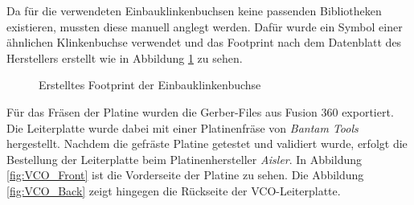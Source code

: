 Da für die verwendeten Einbauklinkenbuchsen keine passenden Bibliotheken existieren, mussten diese manuell anglegt werden.
Dafür wurde ein Symbol einer ähnlichen Klinkenbuchse verwendet und das Footprint nach dem Datenblatt des Herstellers erstellt wie in Abbildung \ref{fig:Klinkenbuchse Footprint} zu sehen.

\begin{figure}[h]
	\centering
	\setlength{\fboxsep}{1pt} %
	\setlength{\fboxrule}{1pt} %
	\caption{Erstelltes Footprint der Einbauklinkenbuchse}
	\label{fig:Klinkenbuchse Footprint}
\end{figure}


Für das Fräsen der Platine wurden die Gerber-Files aus Fusion 360 exportiert.
Die Leiterplatte wurde dabei mit einer Platinenfräse von \textit{Bantam Tools} hergestellt.
Nachdem die gefräste Platine getestet und validiert wurde, erfolgt die Bestellung der Leiterplatte beim Platinenhersteller \textit{Aisler}. 
In Abbildung \ref{fig:VCO_Front} ist die Vorderseite der Platine zu sehen.
Die Abbildung \ref{fig:VCO_Back} zeigt hingegen die Rückseite der VCO-Leiterplatte. 

